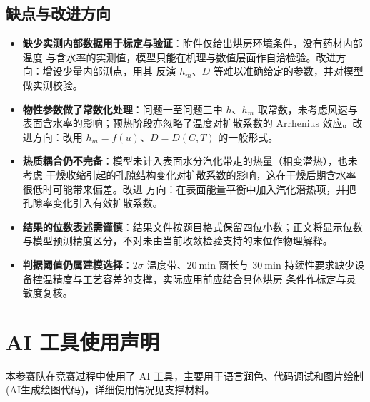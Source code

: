 \documentclass[12pt,a4paper]{ctexart}
\begin{document}
\subsection{缺点与改进方向}
\begin{itemize}
    \item \textbf{缺少实测内部数据用于标定与验证}：附件仅给出烘房环境条件，没有药材内部温度
    与含水率的实测值，模型只能在机理与数值层面作自洽检验。改进方向：增设少量内部测点，用其
    反演 $h_m$、$D$ 等难以准确给定的参数，并对模型做实测校验。

    \item \textbf{物性参数做了常数化处理}：问题一至问题三中 $h$、$h_m$ 取常数，未考虑风速与
    表面含水率的影响；预热阶段亦忽略了温度对扩散系数的 Arrhenius 效应。改进方向：改用
    $h_m=f(u)$、$D=D(C,T)$ 的一般形式。

    \item \textbf{热质耦合仍不完备}：模型未计入表面水分汽化带走的热量（相变潜热），也未考虑
    干燥收缩引起的孔隙结构变化对扩散系数的影响，这在干燥后期含水率很低时可能带来偏差。改进
    方向：在表面能量平衡中加入汽化潜热项，并把孔隙率变化引入有效扩散系数。

    \item \textbf{结果的位数表述需谨慎}：结果文件按题目格式保留四位小数；正文将显示位数与模型预测精度区分，不对未由当前收敛检验支持的末位作物理解释。

    \item \textbf{判据阈值仍属建模选择}：$2\sigma$ 温度带、$20\ \mathrm{min}$ 窗长与
    $30\ \mathrm{min}$ 持续性要求缺少设备控温精度与工艺容差的支撑，实际应用前应结合具体烘房
    条件作标定与灵敏度复核。
\end{itemize}


\section*{AI 工具使用声明}

本参赛队在竞赛过程中使用了 AI 工具，主要用于语言润色、代码调试和图片绘制(AI生成绘图代码)，详细使用情况见支撑材料。

\end{document}
